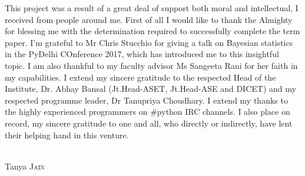 \begin{acknowledgements}

This project was a result of a great deal of support both moral and intellectual, I received from people around me. First of all I would like to thank the Almighty for blessing me with the determination required to successfully complete the term paper. I'm grateful to Mr Chris Stucchio for giving a talk on Bayesian statistics in the PyDelhi COnference 2017, which has introduced me to this insightful topic. I am also thankful to my faculty advisor Ms Sangeeta Rani for her faith in my capabilities. I extend my sincere gratitude to the respected Head of the Institute, Dr. Abhay Bansal (Jt.Head-ASET, Jt.Head-ASE and DICET) and my respected programme leader, Dr Tanupriya Choudhary. I extend my thanks to the highly experienced programmers on \#python IRC channels. I also place on record, my sincere gratitude to one and all, who directly or indirectly, have lent their helping hand in this venture.

\begin{flushright}
  \textsc{}\\[1.0cm]
  Tanya \textsc{Jain}
\end{flushright}

\end{acknowledgements}